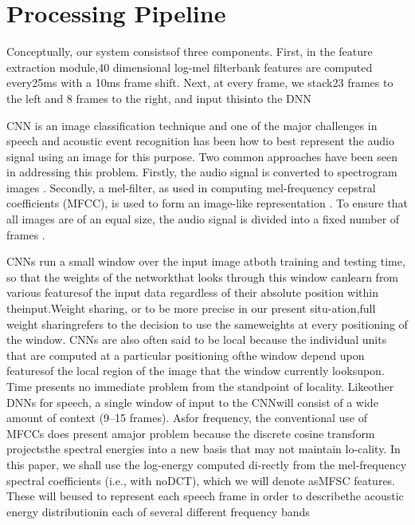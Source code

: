 
\section{Processing Pipeline}
\label{sec:processing_architecture}
 Conceptually, our system consistsof three components.   First,  in the feature extraction module,40 dimensional log-mel filterbank features are computed every25ms with a 10ms frame shift.  Next, at every frame, we stack23 frames to the left and 8 frames to the right, and input thisinto the DNN
 
 
CNN is an image classification technique and one of the major challenges in speech and acoustic event recognition has been how to best represent the audio signal using an image for this purpose. Two common approaches have been seen in addressing this problem. Firstly, the audio signal is converted to spectrogram images \cite{zhang2015robust}. Secondly, a mel-filter, as used in computing mel-frequency cepstral coefficients (MFCC), is used to form an image-like representation \cite{abdel2014convolutional]}.  To ensure that all images are of an equal size, the audio signal is divided into a fixed number of frames \cite{We refer this as the mel-spectrogram.}.


CNNs run a small window over the input image atboth training and testing time, so that the weights of the networkthat looks through this window canlearn from various featuresof the input data regardless of their absolute position within theinput.Weight sharing, or to be more precise in our present situ-ation,full weight sharingrefers to the decision to use the sameweights at every positioning of the window. CNNs are also often said to be local because the individual units that are computed at a particular positioning ofthe window depend upon featuresof the local region of the image that the window currently looksupon.
 Time presents no immediate problem from the standpoint of locality. Likeother DNNs for speech, a single window of input to the CNNwill consist of a wide amount of context (9–15 frames). Asfor frequency, the conventional use of MFCCs does present amajor problem because the discrete cosine transform projectsthe spectral energies into a new basis that may not maintain lo-cality. In this paper, we shall use the log-energy computed di-rectly from the mel-frequency spectral coefficients (i.e., with noDCT), which we will denote asMFSC features. These will beused to represent each speech frame in order to describethe acoustic energy distributionin each of several different frequency bands

